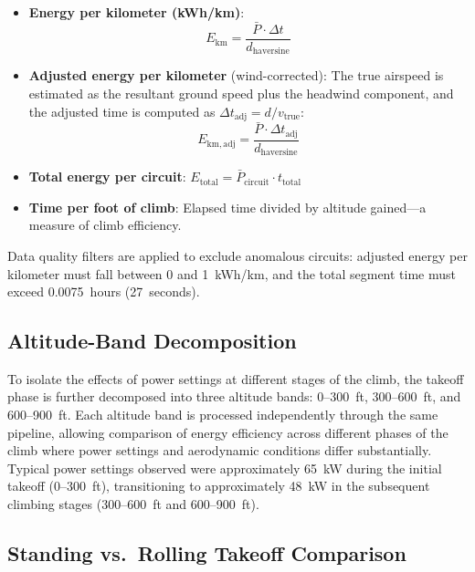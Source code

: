 \documentclass[11pt,a4paper]{article}
\begin{document}
\begin{itemize}
    \item \textbf{Energy per kilometer (kWh/km)}:
    \begin{equation}
        E_{\mathrm{km}} = \frac{\bar{P} \cdot \Delta t}{d_{\mathrm{haversine}}}
    \end{equation}

    \item \textbf{Adjusted energy per kilometer} (wind-corrected): The true airspeed is estimated as the resultant ground speed plus the headwind component, and the adjusted time is computed as $\Delta t_{\mathrm{adj}} = d / v_{\mathrm{true}}$:
    \begin{equation}
        E_{\mathrm{km,adj}} = \frac{\bar{P} \cdot \Delta t_{\mathrm{adj}}}{d_{\mathrm{haversine}}}
    \end{equation}

    \item \textbf{Total energy per circuit}: $E_{\mathrm{total}} = \bar{P}_{\mathrm{circuit}} \cdot t_{\mathrm{total}}$

    \item \textbf{Time per foot of climb}: Elapsed time divided by altitude gained---a measure of climb efficiency.
\end{itemize}

Data quality filters are applied to exclude anomalous circuits: adjusted energy per kilometer must fall between 0 and 1~kWh/km, and the total segment time must exceed 0.0075~hours (27~seconds).

\subsection{Altitude-Band Decomposition}

To isolate the effects of power settings at different stages of the climb, the takeoff phase is further decomposed into three altitude bands: 0--300~ft, 300--600~ft, and 600--900~ft.
Each altitude band is processed independently through the same pipeline, allowing comparison of energy efficiency across different phases of the climb where power settings and aerodynamic conditions differ substantially.
Typical power settings observed were approximately 65~kW during the initial takeoff (0--300~ft), transitioning to approximately 48~kW in the subsequent climbing stages (300--600~ft and 600--900~ft).

\subsection{Standing vs.\ Rolling Takeoff Comparison}
\end{document}
